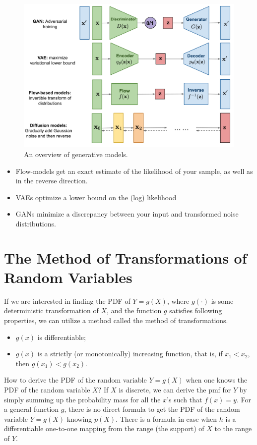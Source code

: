 
\begin{figure}[h]
	\centering
	\includegraphics[scale=0.53]{./images/generative/flows/generative_models.png}
	\caption{An overview of generative models.}
\end{figure}

\begin{itemize}
	\item Flow-models get an exact estimate of the likelihood of your sample, as well as in the reverse direction. 
	\item VAEs optimize a lower bound on the (log) likelihood 
	\item GANs minimize a discrepancy between your input and transformed noise distributions. 
\end{itemize}



\section{The Method of Transformations of Random Variables}

If we are interested in finding the PDF of $Y=g(X)$, where $g(\cdot)$ is some deterministic transformation of $X$, and the function $g$ satisfies following properties, we can utilize a method called the method of transformations.
\begin{itemize}
	\item $g(x)$ is differentiable;
	\item $g(x)$ is a strictly (or monotonically) increasing function, that is, if $x_1<x_2$, then $g(x_1)<g(x_2)$.
\end{itemize}

How to derive the PDF of the random variable $Y=g(X)$ when one knows the PDF of the random variable $X$? If $X$ is discrete, we can derive the pmf for $Y$ by simply summing up the probability mass for all the $x$'s such that $f(x)=y$. For a general function $g$, there is no direct formula to get the PDF of the random variable $Y=g(X)$ knowing $p(X)$. There is a formula in case when $h$ is a differentiable one-to-one mapping from the range (\ie the support) of $X$ to the range of $Y$.


